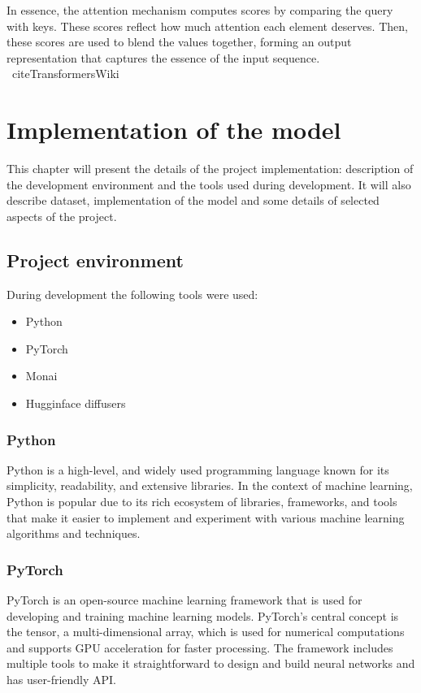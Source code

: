 \documentclass[11pt,a4paper]{report}
\begin{document}
In essence, the attention mechanism computes scores by comparing the query with keys. These scores reflect how much attention each element deserves. Then, these scores are used to blend the values together, forming an output representation that captures the essence of the input sequence. \cite{AttentionIsAll} \cite{AttentionWiki}\ cite{TransformersWiki}

\chapter{Implementation of the model}
This chapter will present the details of the project implementation: description of the development environment and the tools used during development. It will also describe dataset, implementation of the model and some details of selected aspects of the project.
\section{Project environment} %
During development the following tools were used:
\begin{itemize}
\item Python 
\item PyTorch
\item Monai
\item Hugginface diffusers 
\end{itemize}
\subsection{Python}
Python is a high-level, and widely used programming language known for its simplicity, readability, and extensive libraries. In the context of machine learning, Python is popular due to its rich ecosystem of libraries, frameworks, and tools that make it easier to implement and experiment with various machine learning algorithms and techniques. \cite{Python}
\subsection{PyTorch}
PyTorch is an open-source machine learning framework that is used for developing and training machine learning models. PyTorch's central concept is the tensor, a multi-dimensional array, which is used for numerical computations and supports GPU acceleration for faster processing. The framework includes multiple tools to make it straightforward to design and build neural networks and has user-friendly API. \cite{Pytorch}
\end{document}

